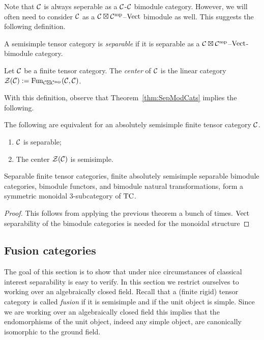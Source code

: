 \documentclass{amsart}
\begin{document}
Note that $\mathcal C$ is always seperable as a $\mathcal C$-$\mathcal C$ bimodule category.  However, we will often need to consider $\mathcal C$ as a $\mathcal C \boxtimes \mathcal C^{\mathrm{mp}}$--$\mathrm{Vect}$ bimodule as well.  This suggests the following definition.

\begin{definition}
	A semisimple tensor category is {\em separable} if it is separable as a $\mathcal C \boxtimes \mathcal C^{\mathrm{mp}}$--$\mathrm{Vect}$-bimodule category.  
\end{definition}


\begin{definition}
	Let $\mathcal C$ be a finite tensor category. The {\em center} of $\mathcal C$ is the linear category $\mathcal Z(\mathcal C) := \operatorname{Fun}_{\mathcal C \boxtimes \mathcal C^{\mathrm{mp}}}(\mathcal C, \mathcal C)$.
\end{definition}

With this definition, observe that Theorem~\ref{thm:SepModCats} implies the following.

\begin{corollary}
	The following are equivalent for an absolutely semisimple finite tensor category $\mathcal C$.
	\begin{enumerate}
		\item $\mathcal C$ is separable;
		\item The center $\mathcal Z(\mathcal C)$ is semisimple.
	\end{enumerate} 
\end{corollary}

\begin{theorem}
Separable finite tensor categories, finite absolutely semisimple separable bimodule categories, bimodule functors, and bimodule natural transformations, form a symmetric monoidal $3$-subcategory of $\mathrm{TC}$.
\end{theorem}
\begin{proof}
This follows from applying the previous theorem a bunch of times.  $\mathrm{Vect}$ separability of the bimodule categories is needed for the monoidal structure
\end{proof}


\subsection{Fusion categories} \label{sec:tc-fusion}

The goal of this section is to show that under nice circumstances of classical interest  separability is easy to verify. In this section we restrict ourselves to working over an algebraically closed field. Recall that a (finite rigid) tensor category is called \emph{fusion} if it is semisimple and if the unit object is simple. Since we are working over an algebraically closed field this implies that the endomorphisms of the unit object, indeed any simple object, are canonically isomorphic to the ground field. 
\end{document}
